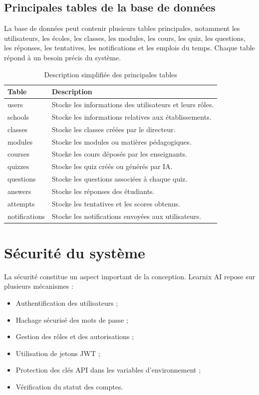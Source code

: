 \documentclass[12pt,a4paper]{report}
\begin{document}
\subsection{Principales tables de la base de données}

La base de données peut contenir plusieurs tables principales, notamment les
utilisateurs, les écoles, les classes, les modules, les cours, les quiz, les
questions, les réponses, les tentatives, les notifications et les emplois du
temps. Chaque table répond à un besoin précis du système.

\begin{longtable}{|m{4cm}|m{9cm}|}
\caption{Description simplifiée des principales tables}\\
\hline
\textbf{Table} & \textbf{Description} \\
\hline
users & Stocke les informations des utilisateurs et leurs rôles. \\
\hline
schools & Stocke les informations relatives aux établissements. \\
\hline
classes & Stocke les classes créées par le directeur. \\
\hline
modules & Stocke les modules ou matières pédagogiques. \\
\hline
courses & Stocke les cours déposés par les enseignants. \\
\hline
quizzes & Stocke les quiz créés ou générés par IA. \\
\hline
questions & Stocke les questions associées à chaque quiz. \\
\hline
answers & Stocke les réponses des étudiants. \\
\hline
attempts & Stocke les tentatives et les scores obtenus. \\
\hline
notifications & Stocke les notifications envoyées aux utilisateurs. \\
\hline
\end{longtable}

\section{Sécurité du système}

La sécurité constitue un aspect important de la conception. Learnix AI repose
sur plusieurs mécanismes :

\begin{itemize}
    \item Authentification des utilisateurs ;
    \item Hachage sécurisé des mots de passe ;
    \item Gestion des rôles et des autorisations ;
    \item Utilisation de jetons JWT ;
    \item Protection des clés API dans les variables d'environnement ;
    \item Vérification du statut des comptes.
\end{itemize}
\end{document}
